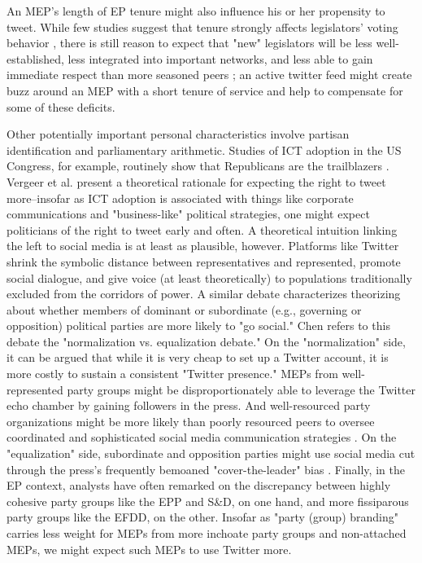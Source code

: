 \documentclass[12pt]{article}\usepackage[]{graphicx}\usepackage[]{color}
\begin{document}
      An MEP's length of EP tenure might also influence his or her propensity to tweet. While few studies suggest that tenure strongly affects legislators' voting behavior \cite{urich.1959}, there is still reason to expect that "new" legislators will be less well-established, less integrated into important networks, and less able to gain immediate respect than more seasoned peers \cite{peterson.2012}; an active twitter feed might create buzz around an MEP with a short tenure of service and help to compensate for some of these deficits. 
    
    	Other potentially important personal characteristics involve partisan identification and parliamentary arithmetic. Studies of ICT adoption in the US Congress, for example, routinely show that Republicans are the trailblazers \cite{chi.yang.2011, gibson.rommele.2001, glassman.straus.shogan.2013, shogan.2010}. Vergeer et al. \citeyear{vergeer.hermans.sams.2011} present a theoretical rationale for expecting the right to tweet more--insofar as ICT adoption is associated with things like corporate communications and "business-like" political strategies, one might expect politicians of the right to tweet early and often. A theoretical intuition linking the left to social media is at least as plausible, however. Platforms like Twitter shrink the symbolic distance between representatives and represented, promote social dialogue, and give voice (at least theoretically) to populations traditionally excluded from the corridors of power. A similar debate characterizes theorizing about whether members of dominant or subordinate (e.g., governing or opposition) political parties are more likely to "go social." Chen \citeyear{chen.2010} refers to this debate the "normalization vs. equalization debate." On the "normalization" side, it can be argued that while it is very cheap to set up a Twitter account, it is more costly to sustain a consistent "Twitter presence." MEPs from well-represented party groups might be disproportionately able to leverage the Twitter echo chamber by gaining followers in the press. And well-resourced party organizations might be more likely than poorly resourced peers to oversee coordinated and sophisticated social media communication strategies \cite{gibson.ward.2009, vergeer.hermans.sams.2011}. On the "equalization" side, subordinate and opposition parties might use social media cut through the press's frequently bemoaned "cover-the-leader" bias \cite{ausserhoffer.maireder.2013, cook.1998, peterson.2012, williams.gulati.2011}. Finally, in the EP context, analysts have often remarked on the discrepancy between highly cohesive party groups like the EPP and S\&D, on one hand, and more fissiparous party groups like the EFDD, on the other. Insofar as "party (group) branding" carries less weight for MEPs from more inchoate party groups and non-attached MEPs, we might expect such MEPs to use Twitter more.  
	
\end{document}
